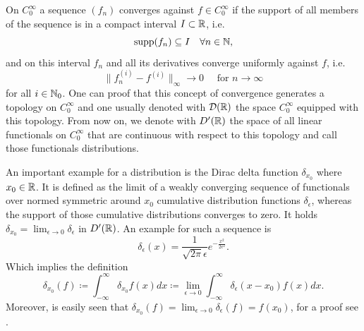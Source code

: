 \begin{definition}[Distributions]
	On $C_{0}^{\infty}$ a sequence $(f_{n})$ converges against $f \in C_{0}^{\infty}$ if the support of all members of the sequence is in a compact interval $I \subset \mathbb{R}$, i.e.
	$$ \operatorname{supp} (f_{n}) \subseteq I \quad \forall n \in \mathbb{N}, $$
	and on this interval $f_{n}$ and all its derivatives converge uniformly against $f$, i.e.
	\[ \| f_{n}^{(i)} - f^{(i)} \|_{\infty} \rightarrow 0 \quad \text{ for } n \rightarrow \infty \]
	for all $i \in \mathbb{N}_{0}$. One can proof that this concept of convergence generates a topology on $C_{0}^{\infty}$ and one usually denoted with $\mathcal{D}(\mathbb{R})$ the space $C_{0}^{\infty}$ equipped with this topology. From now on, we denote with $D'(\mathbb{R})$ the space of all linear functionals on $C_{0}^{\infty}$ that are continuous with respect to this topology and call those functionals distributions.
\end{definition}
An important example for a distribution is the Dirac delta function $\delta_{x_{0}}$ where $x_{0} \in \mathbb{R}$. It is defined as the limit of a weakly converging sequence of functionals over normed symmetric around $x_{0}$ cumulative distribution functions $\delta_{\epsilon}$, whereas the support of those cumulative distributions converges to zero. It holds $\delta_{x_{0}} = \lim_{\epsilon \rightarrow 0} \delta_{\epsilon}$ in $D'(\mathbb{R})$. An example for such a sequence is
	\begin{equation}
		\delta_{\epsilon}(x) = \frac{1}{\sqrt{2 \pi} \epsilon} e^{-\frac{x^{2}}{2 \epsilon^{2}}}. \label{smooth-potential}
	\end{equation} 
Which implies the definition
	\[ \delta_{x_{0}}(f) \coloneqq \int_{-\infty}^{\infty} \delta_{x_{0}} f(x) dx \coloneqq \lim_{\epsilon \rightarrow 0} \int_{-\infty}^{\infty} \delta_{\epsilon}(x - x_{0}) f(x) dx. \]
Moreover, is easily seen that $\delta_{x_{0}}(f) = \lim_{\epsilon \rightarrow 0} \delta_{\epsilon}(f) = f(x_{0})$, for a proof see \cite{WeisST}.

